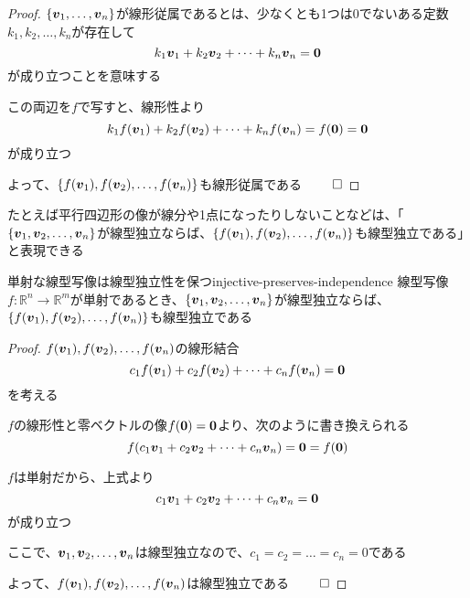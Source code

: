 \documentclass[../../../topic_linear-algebra]{subfiles}
\begin{document}
\begin{proof}
  $\{\vb*{v}_1, \dots, \vb*{v}_n\}$が線形従属であるとは、少なくとも1つは0でないある定数$k_1, k_2, \dots, k_n$が存在して
  \begin{equation*}
    k_1 \vb*{v}_1 + k_2 \vb*{v}_2 + \dots + k_n \vb*{v}_n = \vb*{0}
  \end{equation*}
  が成り立つことを意味する

  この両辺を$f$で写すと、線形性より
  \begin{equation*}
    k_1 f(\vb*{v}_1) + k_2 f(\vb*{v}_2) + \dots + k_n f(\vb*{v}_n) = f(\vb*{0}) = \vb*{0}
  \end{equation*}
  が成り立つ

  よって、$\{ f(\vb*{v}_1), f(\vb*{v}_2), \dots, f(\vb*{v}_n) \}$も線形従属である $\qed$
\end{proof}

\sectionline

たとえば平行四辺形の像が線分や1点になったりしないことなどは、「$\{ \vb*{v}_1, \vb*{v}_2, \dots, \vb*{v}_n \}$が線型独立ならば、$\{ f(\vb*{v}_1), f(\vb*{v}_2), \dots, f(\vb*{v}_n) \}$も線型独立である」と表現できる

\begin{theorem}{単射な線型写像は線型独立性を保つ}{injective-preserves-independence}
  線型写像$f\colon \mathbb{R}^n \to \mathbb{R}^m$が単射であるとき、$\{ \vb*{v}_1, \vb*{v}_2, \dots, \vb*{v}_n \}$が線型独立ならば、$\{ f(\vb*{v}_1), f(\vb*{v}_2), \dots, f(\vb*{v}_n) \}$も線型独立である
\end{theorem}

\begin{proof}
  $f(\vb*{v}_1), f(\vb*{v}_2), \dots, f(\vb*{v}_n)$の線形結合
  \begin{equation*}
    c_1 f(\vb*{v}_1) + c_2 f(\vb*{v}_2) + \dots + c_n f(\vb*{v}_n) = \vb*{0}
  \end{equation*}
  を考える

  $f$の線形性と零ベクトルの像$f(\vb*{0}) = \vb*{0}$より、次のように書き換えられる
  \begin{equation*}
    f(c_1 \vb*{v}_1 + c_2 \vb*{v}_2 + \dots + c_n \vb*{v}_n) = \vb*{0} = f(\vb*{0})
  \end{equation*}

  $f$は単射だから、上式より
  \begin{equation*}
    c_1 \vb*{v}_1 + c_2 \vb*{v}_2 + \dots + c_n \vb*{v}_n = \vb*{0}
  \end{equation*}
  が成り立つ

  ここで、$\vb*{v}_1, \vb*{v}_2, \dots, \vb*{v}_n$は線型独立なので、$c_1 = c_2 = \dots = c_n = 0$である

  よって、$f(\vb*{v}_1), f(\vb*{v}_2), \dots, f(\vb*{v}_n)$は線型独立である $\qed$
\end{proof}
\end{document}
